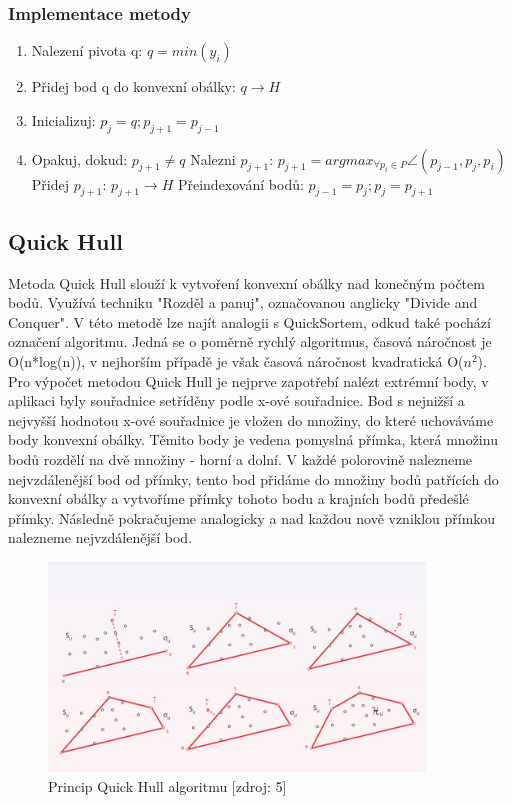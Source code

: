 \documentclass[a4paper, 12pt]{article}
\begin{document}
\subsubsection{Implementace metody}
\begin{enumerate}
\item Nalezení pivota q:  $ q = min(y_i) $ 
\item Přidej bod q do konvexní obálky:  $ q \rightarrow H  $ 
\item Inicializuj: $p_j = q; p_{j+1} = p_{j-1}$
\item Opakuj, dokud: $ p_{j+1} \ne q $
\subitem Nalezni $p_{j+1}$: $ p_{j+1} = arg  max_{\forall p_i \in P}  \angle (p_{j-1}, p_j, p_i)$
\subitem Přidej $p_{j+1}$: $ p_{j+1} \rightarrow H  $
\subitem Přeindexování bodů: $ p_{j-1} = p_j; p_j = p_{j+1}  $
\end{enumerate}

\subsection{Quick Hull}
Metoda Quick Hull slouží k vytvoření konvexní obálky nad konečným počtem bodů. Využívá techniku "Rozděl a panuj", označovanou anglicky "Divide and Conquer". V této metodě lze najít analogii s QuickSortem, odkud také pochází označení algoritmu. Jedná se o poměrně rychlý algoritmus, časová náročnost je O(n*log(n)), v nejhorším případě je však časová náročnost kvadratická O($n^2$). \\

Pro výpočet metodou Quick Hull je nejprve zapotřebí nalézt extrémní body, v aplikaci byly souřadnice setříděny podle x-ové souřadnice. Bod s nejnižší a nejvyšší hodnotou x-ové souřadnice je vložen do množiny, do které uchováváme body konvexní obálky. Těmito body je vedena pomyslná přímka, která množinu bodů rozdělí na dvě množiny - horní a dolní. V každé polorovině nalezneme nejvzdálenější bod od přímky, tento bod přidáme do množiny bodů patřících do konvexní obálky a vytvoříme přímky tohoto bodu a krajních bodů předešlé přímky. Následně pokračujeme analogicky a nad každou nově vzniklou přímkou nalezneme nejvzdálenější bod.

\begin{figure}[h!]
	\centering
	\includegraphics[width=10cm]{quickhull.jpg}
	\caption{Princip Quick Hull algoritmu [zdroj: 5]}
\end{figure}
\end{document}
